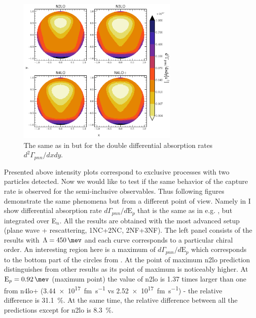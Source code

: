     \begin{figure}[h]
        \begin{center}
        \includegraphics[width=0.7\textwidth]{PlotData/PION/Dalitz_maps/figures/Dalitz_map_pnn_xy_orders.pdf}
        \end{center}
        \caption{The same as in  but for the double differential absorption rates
        $d^2 \Gamma_{pnn}/dxdy$.}
        \label{pion_map_xy_order}
    \end{figure}

    
    Presented above intensity plots correspond to exclusive processes with two particles detected.
    Now we would like to test if the same behavior of the capture rate is observed for
    the semi-inclusive observables.
    Thus following figures demonstrate the same phenomena but from a different point of view.
    Namely in  I show differential absorption rate $d\Gamma_{pnn} /d\text{E}_p$
    that is the same as in e.g. , but integrated over E$_n$.
    All the results are obtained with the most advanced setup (plane wave + rescattering, 1NC+2NC, 2NF+3NF).
    The left panel consists of the results with $\Lambda=\SI{450}{\mev}$ and each curve corresponds 
    to a particular chiral order. An interesting region here is a maximum
    of $d\Gamma_{pnn} /d\text{E}_p$  which corresponds
    to the bottom part of the circles from . At the point of maximum
    \gls{n2lo} prediction distinguishes from other results as its point of maximum is noticeably higher.
    At $\text{E}_p = \SI{0.92}{\mev}$ (maximum point) the value of \gls{n2lo} is
    \num{1.37} times larger than one from \gls{n4lo+} (\SI{3.44e+17}{fm.\s^{-1}}
    vs \SI{2.52e+17}{fm.\s^{-1}}) - the relative difference is \SI{31.1}{\percent}.
    At the same time, the relative difference between all the predictions except for \gls{n2lo}
    is \SI{8.3}{\percent}.

